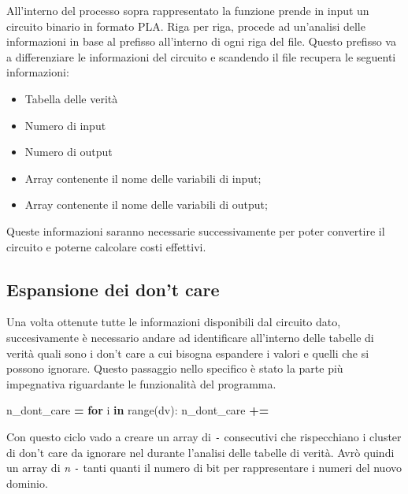 \documentclass[
]{book}
\newenvironment{Shaded}{\begin{snugshade}}{\end{snugshade}}
\newcommand{\BuiltInTok}[1]{#1}
\newcommand{\ControlFlowTok}[1]{\textcolor[rgb]{0.13,0.29,0.53}{\textbf{#1}}}
\newcommand{\KeywordTok}[1]{\textcolor[rgb]{0.13,0.29,0.53}{\textbf{#1}}}
\newcommand{\NormalTok}[1]{#1}
\newcommand{\OperatorTok}[1]{\textcolor[rgb]{0.81,0.36,0.00}{\textbf{#1}}}
\newcommand{\StringTok}[1]{\textcolor[rgb]{0.31,0.60,0.02}{#1}}
\providecommand{\tightlist}{%
  \setlength{\itemsep}{0pt}\setlength{\parskip}{0pt}}
\begin{document}
All'interno del processo sopra rappresentato la funzione prende in input un circuito binario in formato PLA. Riga per riga, procede ad un'analisi delle informazioni in base al prefisso all'interno di ogni riga del file. Questo prefisso va a differenziare le informazioni del circuito e scandendo il file recupera le seguenti informazioni:

\begin{itemize}
\tightlist
\item
  Tabella delle verità
\item
  Numero di input
\item
  Numero di output
\item
  Array contenente il nome delle variabili di input;
\item
  Array contenente il nome delle variabili di output;
\end{itemize}

Queste informazioni saranno necessarie successivamente per poter convertire il circuito e poterne calcolare costi effettivi.

\newpage

\hypertarget{espansione-dei-dont-care}{%
\subsection{Espansione dei don't care}\label{espansione-dei-dont-care}}

Una volta ottenute tutte le informazioni disponibili dal circuito dato, succesivamente è necessario andare ad identificare all'interno delle tabelle di verità quali sono i don't care a cui bisogna espandere i valori e quelli che si possono ignorare. Questo passaggio nello specifico è stato la parte più impegnativa riguardante le funzionalità del programma.

\begin{Shaded}
\begin{Highlighting}[]
\NormalTok{n\_dont\_care }\OperatorTok{=} \StringTok{\textquotesingle{}\textquotesingle{}}
  \ControlFlowTok{for}\NormalTok{ i }\KeywordTok{in} \BuiltInTok{range}\NormalTok{(dv):}
\NormalTok{    n\_dont\_care }\OperatorTok{+=} \StringTok{\textquotesingle{}{-}\textquotesingle{}}
\end{Highlighting}
\end{Shaded}

Con questo ciclo vado a creare un array di \texttt{-} consecutivi che rispecchiano i cluster di don't care da ignorare nel durante l'analisi delle tabelle di verità. Avrò quindi un array di \emph{n} \texttt{-} tanti quanti il numero di bit per rappresentare i numeri del nuovo dominio.
\end{document}
